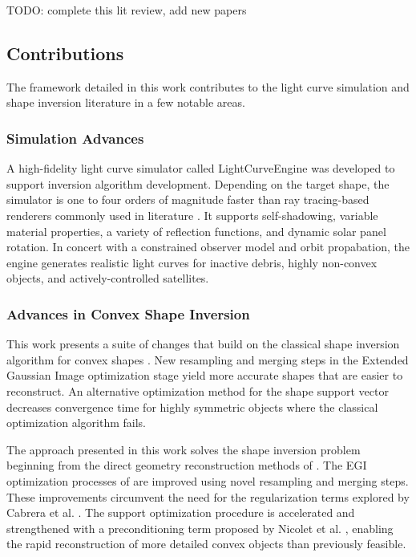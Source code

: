 TODO: complete this lit review, add new papers

\subsection{Contributions}

The framework detailed in this work contributes to the light curve simulation and shape inversion literature in a few notable areas. 

\subsubsection{Simulation Advances}

A high-fidelity light curve simulator called LightCurveEngine was developed to support inversion algorithm development. Depending on the target shape, the simulator is one to four orders of magnitude faster than ray tracing-based renderers commonly used in literature \cite{fan2019, allworth2020}. It supports self-shadowing, variable material properties, a variety of reflection functions, and dynamic solar panel rotation. In concert with a constrained observer model and orbit propabation, the engine generates realistic light curves for inactive debris, highly non-convex objects, and actively-controlled satellites. 

\subsubsection{Advances in Convex Shape Inversion}

This work presents a suite of changes that build on the classical shape inversion algorithm for convex shapes \cite{robinson2022}. New resampling and merging steps in the Extended Gaussian Image optimization stage yield more accurate shapes that are easier to reconstruct. An alternative optimization method for the shape support vector decreases convergence time for highly symmetric objects where the classical optimization algorithm fails.

The approach presented in this work solves the shape inversion problem beginning from the direct geometry reconstruction methods of \cite{kaasalainen2001,fan2020thesis}. The EGI optimization processes of \cite{fan2020thesis,cabrera2021,kaasalainen2001} are improved using novel resampling and merging steps. These improvements circumvent the need for the regularization terms explored by Cabrera et al. \cite{cabrera2021}. The support optimization procedure is accelerated and strengthened with a preconditioning term proposed by Nicolet et al. \cite{nicolet2021}, enabling the rapid reconstruction of more detailed convex objects than previously feasible.


